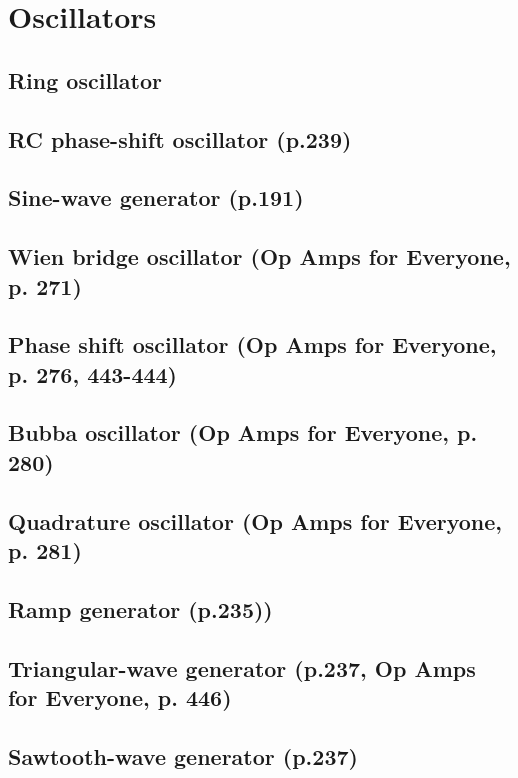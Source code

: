 \chapter{Oscillators}

\section{Ring oscillator}

\section{RC phase-shift oscillator (p.239)}

\section{Sine-wave generator (p.191)}

\section{Wien bridge oscillator (Op Amps for Everyone, p. 271)}

\section{Phase shift oscillator (Op Amps for Everyone, p. 276, 443-444)}

\section{Bubba oscillator (Op Amps for Everyone, p. 280)}

\section{Quadrature oscillator (Op Amps for Everyone, p. 281)}

\section{Ramp generator (p.235))}

\section{Triangular-wave generator (p.237, Op Amps for Everyone, p. 446)}

\section{Sawtooth-wave generator (p.237)}

